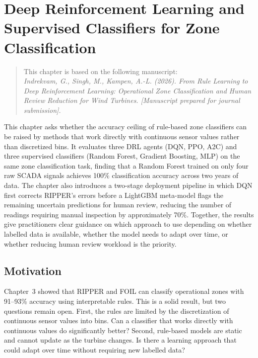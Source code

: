 \chapter{Deep Reinforcement Learning and Supervised Classifiers for Zone Classification}
\label{chap:ch4}

\begin{quote}
\small
This chapter is based on the following manuscript:\\[4pt]
\textit{Indrekvam, G., Singh, M., Kampen, A.-L. (2026). From Rule Learning to Deep
Reinforcement Learning: Operational Zone Classification and Human Review Reduction for
Wind Turbines. [Manuscript prepared for journal submission].}
\end{quote}

This chapter asks whether the accuracy ceiling of rule-based zone classifiers can be
raised by methods that work directly with continuous sensor values rather than discretized
bins. It evaluates three DRL agents (DQN, PPO, A2C) and three supervised classifiers
(Random Forest, Gradient Boosting, MLP) on the same zone classification task, finding
that a Random Forest trained on only four raw SCADA signals achieves 100\% classification
accuracy across two years of data. The chapter also introduces a two-stage deployment
pipeline in which DQN first corrects RIPPER's errors before a LightGBM meta-model flags
the remaining uncertain predictions for human review, reducing the number of readings
requiring manual inspection by approximately 70\%. Together, the results give
practitioners clear guidance on which approach to use depending on whether labelled data
is available, whether the model needs to adapt over time, or whether reducing human
review workload is the priority.

\section{Motivation}
\label{sec:ch4:motivation}

Chapter~3 showed that RIPPER and FOIL can classify operational zones with 91--93\%
accuracy using interpretable rules. This is a solid result, but two questions remain
open. First, the rules are limited by the discretization of continuous sensor values into
bins. Can a classifier that works directly with continuous values do significantly better?
Second, rule-based models are static and cannot update as the turbine changes. Is there a
learning approach that could adapt over time without requiring new labelled data?

